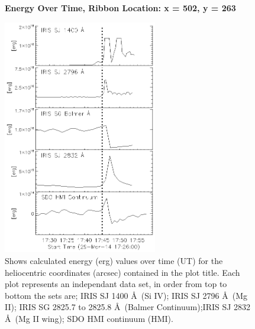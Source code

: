 \begin{figure}[H]
  \begin{center}
  \textbf{Energy Over Time, Ribbon Location: x = 502, y = 263 }\par\medskip
  \includegraphics[width=0.6\textwidth]{29-Mar-14-Ribbon-xyPosition-502-263-Frame-2-Energy-Ladder}
  \end{center}
  \caption{Shows calculated energy (erg) values over time (UT) for the heliocentric coordinates (arcsec) contained in the plot title. Each plot represents an independant data set, in order from top to bottom the sets are; IRIS SJ 1400 \AA\ (Si IV); IRIS SJ 2796 \AA\ (Mg II); IRIS SG  2825.7 to 2825.8 \AA\ (Balmer Continuum);IRIS SJ 2832 \AA\ (Mg II wing); SDO HMI continuum (HMI).}\label{erb17}
\end{figure}

